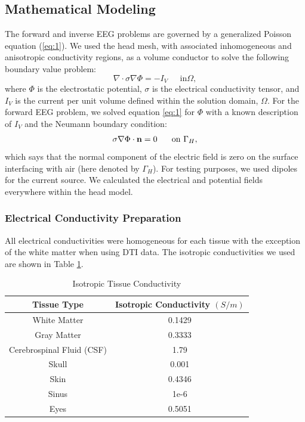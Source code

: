 \subsection{Mathematical Modeling}
\label{sec:math}


The forward and inverse EEG problems are governed by a generalized Poisson equation (\ref{eq:1}). We used the head mesh, with associated inhomogeneous and anisotropic conductivity regions, as a volume conductor to solve the following boundary value problem:
%
\begin{equation}
\label{eq:1} \nabla\cdot\sigma\nabla\Phi = -I_{V} \;\;\;\;\mbox{ in
}\Omega,
\end{equation} 
%
where $\Phi$ is the electrostatic potential, $\sigma$ is the electrical conductivity tensor, and $I_{V}$ is the current per unit volume defined within the solution domain, $\Omega$. For the forward EEG problem, we solved equation \ref{eq:1} for $\Phi$ with a known description of $I_{V}$ and the Neumann boundary condition:
%
\begin{equation} \sigma\nabla\Phi\cdot{\bf
n} = 0\;\;\;\;\;\mbox{ on }\Gamma_{H}, 
\end{equation} 
%
which says that the normal component of the electric field is zero on the surface interfacing with air (here denoted by $\Gamma_{H}$). For testing purposes, we used dipoles for the current source. We calculated the electrical and potential fields everywhere within the head model. \cite{SCI:Joh2015c}

\subsubsection{Electrical Conductivity Preparation}
\label{sec:cond}

All electrical conductivities were homogeneous for each tissue with the exception of the white matter when using DTI data. The isotropic conductivities \cite{ref:cond} we used are shown in Table \ref{tab:cond}.

\begin{table}[H]
\centering
\caption{Isotropic Tissue Conductivity}
\label{tab:cond}
\begin{tabular}{|c|c|}
\hline
Tissue Type               & Isotropic Conductivity $(S/m)$ \\ \hline
\hline
White Matter              & 0.1429                         \\ \hline
Gray Matter               & 0.3333                         \\ \hline
Cerebrospinal Fluid (CSF) & 1.79                           \\ \hline
Skull                     & 0.001                          \\ \hline
Skin                      & 0.4346                         \\ \hline
Sinus                     & 1e-6                           \\ \hline
Eyes                      & 0.5051                         \\ \hline
\end{tabular}
\end{table}


